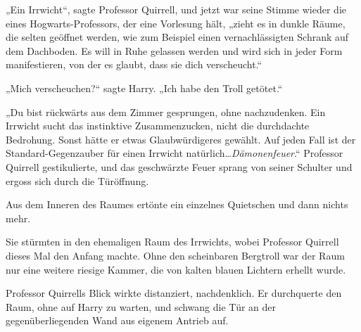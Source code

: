 „Ein Irrwicht“, sagte Professor Quirrell, und jetzt war seine Stimme wieder die eines Hogwarts-Professors, der eine Vorlesung hält, „zieht es in dunkle Räume, die selten geöffnet werden, wie zum Beispiel einen vernachlässigten Schrank auf dem Dachboden. Es will in Ruhe gelassen werden und wird sich in jeder Form manifestieren, von der es glaubt, dass sie dich verscheucht.“

„Mich verscheuchen?“ sagte Harry. „Ich habe den Troll getötet.“

„Du bist rückwärts aus dem Zimmer gesprungen, ohne nachzudenken. Ein Irrwicht sucht das instinktive Zusammenzucken, nicht die durchdachte Bedrohung. Sonst hätte er etwas Glaubwürdigeres gewählt. Auf jeden Fall ist der Standard-Gegenzauber für einen Irrwicht natürlich…\emph{Dämonenfeuer}.“
Professor Quirrell gestikulierte, und das geschwärzte Feuer sprang von seiner Schulter und ergoss sich durch die Türöffnung.

Aus dem Inneren des Raumes ertönte ein einzelnes Quietschen und dann nichts mehr.

Sie stürmten in den ehemaligen Raum des Irrwichts, wobei Professor Quirrell dieses Mal den Anfang machte. Ohne den scheinbaren Bergtroll war der Raum nur eine weitere riesige Kammer, die von kalten blauen Lichtern erhellt wurde.

Professor Quirrells Blick wirkte distanziert, nachdenklich. Er durchquerte den Raum, ohne auf Harry zu warten, und schwang die Tür an der gegenüberliegenden Wand aus eigenem Antrieb auf.

